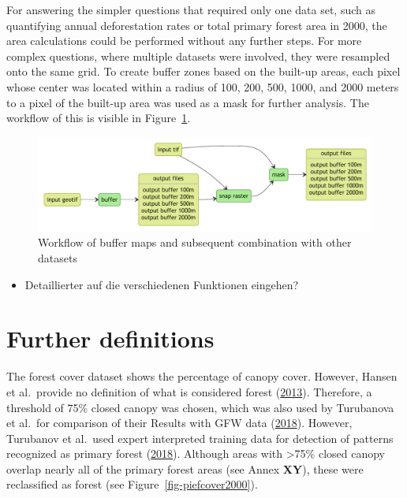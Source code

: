 \documentclass[
  letterpaper,
  DIV=11,
  numbers=noendperiod]{scrreprt}
\providecommand{\tightlist}{%
  \setlength{\itemsep}{0pt}\setlength{\parskip}{0pt}}\usepackage{longtable,booktabs,array}
\begin{document}
For answering the simpler questions that required only one data set,
such as quantifying annual deforestation rates or total primary forest
area in 2000, the area calculations could be performed without any
further steps. For more complex questions, where multiple datasets were
involved, they were resampled onto the same grid. To create buffer zones
based on the built-up areas, each pixel whose center was located within
a radius of 100, 200, 500, 1000, and 2000 meters to a pixel of the
built-up area was used as a mask for further analysis. The workflow of
this is visible in Figure~\ref{fig-bufferworkflow}.

\begin{figure}

{\centering \includegraphics{text/05_method_files/buffer.pdf}

}

\caption{\label{fig-bufferworkflow}Workflow of buffer maps and
subsequent combination with other datasets}

\end{figure}

\begin{itemize}
\tightlist
\item
  Detaillierter auf die verschiedenen Funktionen eingehen?
\end{itemize}

\hypertarget{further-definitions}{%
\section{Further definitions}\label{further-definitions}}

The forest cover dataset shows the percentage of canopy cover. However,
Hansen et al.~provide no definition of what is considered forest
(\protect\hyperlink{ref-hansenHighResolutionGlobalMaps2013}{2013}).
Therefore, a threshold of 75\% closed canopy was chosen, which was also
used by Turubanova et al.~for comparison of their Results with GFW data
(\protect\hyperlink{ref-turubanovaOngoingPrimaryForest2018}{2018}).
However, Turubanov et al.~used expert interpreted training data for
detection of patterns recognized as primary forest
(\protect\hyperlink{ref-turubanovaOngoingPrimaryForest2018}{2018}).
Although areas with \textgreater75\% closed canopy overlap nearly all of
the primary forest areas (see Annex \textbf{XY}), these were
reclassified as forest (see Figure~\ref{fig-piefcover2000}).
\end{document}
